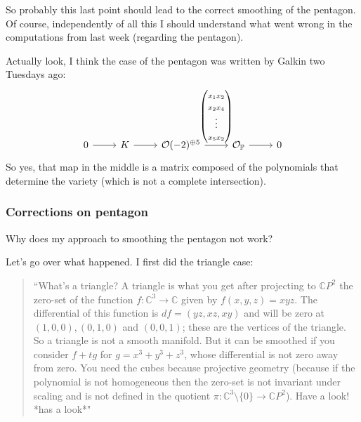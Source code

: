 So probably this last point should lead to the correct smoothing of the pentagon. Of course, independently of all this I should understand what went wrong in the computations from last week (regarding the pentagon).

Actually look, I think the case of the pentagon was written by Galkin two Tuesdays ago:
\[\begin{tikzcd}
	0\arrow[r]& K\arrow[r]&\mathcal{O}(-2)^{\oplus 5}\arrow[r,"\begin{pmatrix} x_1x_2\\x_2x_4\\\vdots \\x_5x_2 \end{pmatrix} "]&\mathcal{O}_\mathbb{P}\arrow[r]&0
\end{tikzcd}\]
So yes, that map in the middle is a matrix composed of the polynomials that determine the variety (which is not a complete intersection).

\subsubsection{Corrections on pentagon}

\begin{question}\leavevmode
Why does my approach to smoothing the pentagon not work?
\end{question}

Let's go over what happened. I first did the triangle case:

\begin{quotation}
	``What's a triangle? A triangle is what you get after projecting to \(\mathbb{C}P^{2}\) the zero-set of the function \(f:\mathbb{C}^3 \to \mathbb{C}\) given by \(f(x,y,z)=xyz\). The differential of this function is \(df=(yz,xz,xy)\) and will be zero at \((1,0,0),(0,1,0)\) and \((0,0,1)\); these are the vertices of the triangle. So a triangle is not a smooth manifold. But it can be smoothed if you consider \(f+tg\) for \(g=x^3+y^3+z^3\), whose differential is not zero away from zero. You need the cubes because projective geometry (because if the polynomial is not homogeneous then the zero-set is not invariant under scaling and is not defined in the quotient \(\pi:\mathbb{C}^{3}\setminus\{0\}\to \mathbb{C}P^{2}\)). Have a look! *has a look*"
\end{quotation}

